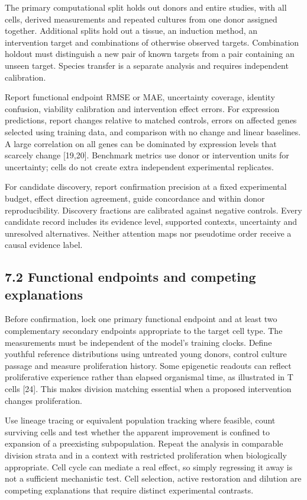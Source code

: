 \documentclass[
  11pt,
  letterpaper,
]{article}
\begin{document}
The primary computational split holds out donors and entire studies,
with all cells, derived measurements and repeated cultures from one
donor assigned together. Additional splits hold out a tissue, an
induction method, an intervention target and combinations of otherwise
observed targets. Combination holdout must distinguish a new pair of
known targets from a pair containing an unseen target. Species transfer
is a separate analysis and requires independent calibration.

Report functional endpoint RMSE or MAE, uncertainty coverage, identity
confusion, viability calibration and intervention effect errors. For
expression predictions, report changes relative to matched controls,
errors on affected genes selected using training data, and comparison
with no change and linear baselines. A large correlation on all genes
can be dominated by expression levels that scarcely change {[}19,20{]}.
Benchmark metrics use donor or intervention units for uncertainty; cells
do not create extra independent experimental replicates.

For candidate discovery, report confirmation precision at a fixed
experimental budget, effect direction agreement, guide concordance and
within donor reproducibility. Discovery fractions are calibrated against
negative controls. Every candidate record includes its evidence level,
supported contexts, uncertainty and unresolved alternatives. Neither
attention maps nor pseudotime order receive a causal evidence label.

\hypertarget{functional-endpoints-and-competing-explanations}{%
\subsection{7.2 Functional endpoints and competing
explanations}\label{functional-endpoints-and-competing-explanations}}

Before confirmation, lock one primary functional endpoint and at least
two complementary secondary endpoints appropriate to the target cell
type. The measurements must be independent of the model's training
clocks. Define youthful reference distributions using untreated young
donors, control culture passage and measure proliferation history. Some
epigenetic readouts can reflect proliferative experience rather than
elapsed organismal time, as illustrated in T cells {[}24{]}. This makes
division matching essential when a proposed intervention changes
proliferation.

Use lineage tracing or equivalent population tracking where feasible,
count surviving cells and test whether the apparent improvement is
confined to expansion of a preexisting subpopulation. Repeat the
analysis in comparable division strata and in a context with restricted
proliferation when biologically appropriate. Cell cycle can mediate a
real effect, so simply regressing it away is not a sufficient
mechanistic test. Cell selection, active restoration and dilution are
competing explanations that require distinct experimental contrasts.
\end{document}
